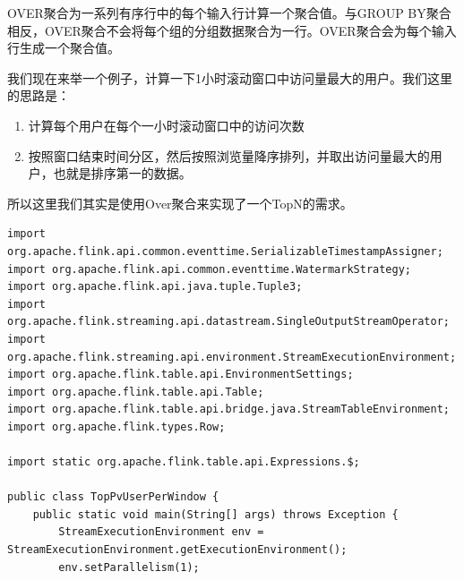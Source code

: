 \documentclass[cn,11pt,chinese]{elegantbook}
\begin{document}
OVER聚合为一系列有序行中的每个输入行计算一个聚合值。与GROUP BY聚合相反，OVER聚合不会将每个组的分组数据聚合为一行。OVER聚合会为每个输入行生成一个聚合值。

我们现在来举一个例子，计算一下1小时滚动窗口中访问量最大的用户。我们这里的思路是：

\begin{enumerate}
  \item 计算每个用户在每个一小时滚动窗口中的访问次数
  \item 按照窗口结束时间分区，然后按照浏览量降序排列，并取出访问量最大的用户，也就是排序第一的数据。
\end{enumerate}

所以这里我们其实是使用Over聚合来实现了一个TopN的需求。

\begin{verbatim}
import org.apache.flink.api.common.eventtime.SerializableTimestampAssigner;
import org.apache.flink.api.common.eventtime.WatermarkStrategy;
import org.apache.flink.api.java.tuple.Tuple3;
import org.apache.flink.streaming.api.datastream.SingleOutputStreamOperator;
import org.apache.flink.streaming.api.environment.StreamExecutionEnvironment;
import org.apache.flink.table.api.EnvironmentSettings;
import org.apache.flink.table.api.Table;
import org.apache.flink.table.api.bridge.java.StreamTableEnvironment;
import org.apache.flink.types.Row;

import static org.apache.flink.table.api.Expressions.$;

public class TopPvUserPerWindow {
    public static void main(String[] args) throws Exception {
        StreamExecutionEnvironment env = StreamExecutionEnvironment.getExecutionEnvironment();
        env.setParallelism(1);


\end{verbatim}
\end{document}
